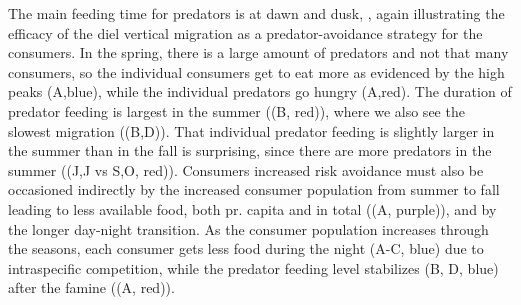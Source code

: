 The main feeding time for predators is at dawn and dusk, , again illustrating the efficacy of the diel vertical migration as a predator-avoidance strategy for the consumers. In the spring, there is a large amount of predators and not that many consumers, so the individual consumers get to eat more as evidenced by the high peaks (A,blue), while the individual predators go hungry (A,red). The duration of predator feeding is largest in the summer ((B, red)), where we also see the slowest migration ((B,D)). That individual predator feeding is slightly larger in the summer than in the fall is surprising, since there are more predators in the summer ((J,J vs S,O, red)). Consumers increased risk avoidance must also be occasioned indirectly by the increased consumer population from summer to fall leading to less available food, both pr. capita and in total ((A, purple)), and by the longer day-night transition. As the consumer population increases through the seasons, each consumer gets less food during the night (A-C, blue) due to intraspecific competition, while the predator feeding level stabilizes (B, D, blue) after the famine ((A, red)).

